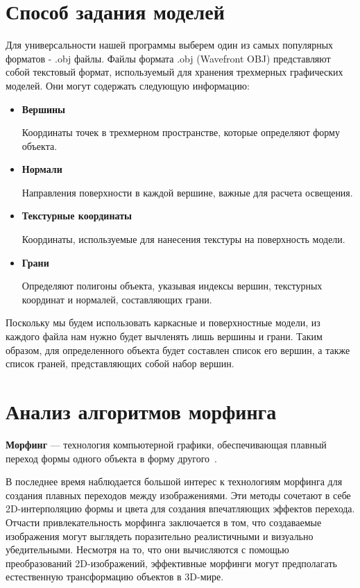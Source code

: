 \section[Способ задания моделей]{Способ задания моделей}
\label{sec:method_set_models}

Для универсальности нашей программы выберем один из самых популярных форматов - .obj файлы. 
Файлы формата .obj (Wavefront OBJ) представляют собой текстовый формат, используемый для хранения трехмерных графических 
моделей. 
Они могут содержать следующую информацию:
\begin{itemize}
	\item \textbf{Вершины}
	
	Координаты точек в трехмерном пространстве, которые определяют форму объекта.
	
	\item \textbf{Нормали}
	
	Направления поверхности в каждой вершине, важные для расчета освещения.
	
	\item \textbf{Текстурные координаты}
	
	Координаты, используемые для нанесения текстуры на поверхность модели.
	
	\item \textbf{Грани}
	
	Определяют полигоны объекта, указывая индексы вершин, текстурных координат и нормалей, составляющих грани.
\end{itemize}

Поскольку мы будем использовать каркасные и поверхностные модели, из каждого файла нам нужно будет вычленять лишь вершины и грани. 
Таким образом, для определенного объекта будет составлен список его вершин, а также список граней, представляющих собой набор вершин.

\section[Анализ алгоритмов морфинга]{Анализ алгоритмов морфинга}
\label{sec:morph_algo}
\textbf{Морфинг} --- технология компьютерной графики, обеспечивающая плавный переход формы одного объекта в форму другого~\cite{morph_spheres}.

В последнее время наблюдается большой интерес к технологиям морфинга для создания плавных переходов между изображениями. 
Эти методы сочетают в себе 2D-интерполяцию формы и цвета для создания впечатляющих эффектов перехода.
Отчасти привлекательность морфинга заключается в том, что создаваемые изображения могут выглядеть поразительно реалистичными и визуально убедительными. 
Несмотря на то, что они вычисляются с помощью преобразований 2D-изображений, эффективные морфинги могут предполагать естественную трансформацию объектов в 3D-мире.

